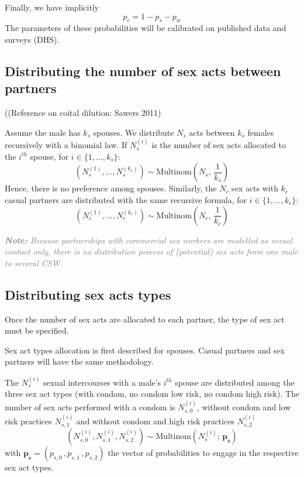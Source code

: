 \documentclass[11pt, onecolumn]{article}
\newcommand{\warning}[1]{\textbf{\textcolor{OrangeRed}{#1}}}
\newcommand{\note}[1]{\textcolor{Grey}{\textit{\textbf{Note:} #1}}}
\begin{document}
 Finally, we have implicitly
$$p_c = 1-p_s-p_w$$
The parameters of these probabilities will be calibrated on published data and surveys (DHS).

\subsection{Distributing the number of sex acts between partners}

((Reference on coital dilution: Sawers 2011)

Assume the male has $k_s$ spouses. We distribute $N_s$ acts between $k_s$ females recursively with a binomial law. If $N^{(i)}_s$ is the number of sex acts allocated to the $i^{th}$ spouse, for $i \in \{1,...,k_s\}$:
$$ \left(N^{(1)}_s,...,N^{(k_s)}_s \right)\sim \mathrm{Multinom}\left(N_s, \, \frac{1}{k_s}\right)$$
Hence, there is no preference among spouses. 
Similarly, the $N_c$ sex acts with $k_c$ casual partners are distributed with the same recursive formula, for $i \in \{1,...,k_c\}$:
$$ \left(N^{(1)}_c,...,N^{(k_c)}_c \right)\sim \mathrm{Multinom}\left(N_c, \, \frac{1}{k_c}\right)$$

\note{Because partnerships with commercial sex workers are modelled as sexual contact only, there is no distribution process of (potential) sex acts from one male to several CSW.}

\subsection{Distributing sex acts types}

Once the number of sex acts are allocated to each partner, the type of sex act must be specified.

Sex act types allocation is first described for spouses. Casual partners and sex partners will have the same methodology.

The $N^{(i)}_s$ sexual intercourses with a male's $i^{th}$ spouse are distributed among the three sex act types (with condom, no condom low risk, no condom high risk). The number of sex acts performed with a condom is $N^{(i)}_{s,0}$, without condom and low risk practices $N^{(i)}_{s,1}$ and without condom and high risk practices $N^{(i)}_{s,2}$
$$\left(N^{(i)}_{s,0},N^{(i)}_{s,1},N^{(i)}_{s,2}\right) \sim \mathrm{Multinom}(N^{(i)}_s;\, \mathbf{p_s}) $$
with $\mathbf{p_s}=(p_{s,0}\,,p_{s,1}\,,p_{s,2})$ the vector of probabilities to engage in the respective sex act types.
\end{document}
